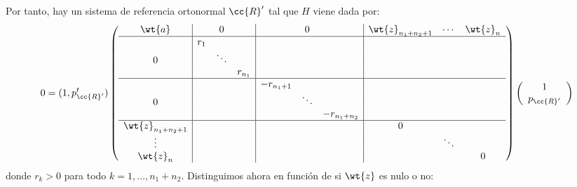Por tanto, hay un sistema de referencia ortonormal $\cc{R}'$ tal que $H$ viene dada por:
\begin{equation*}
    0 = (1, p_{\cc{R}'}^t)\left(
    \begin{array}{c|ccc|ccc|ccc}
        \wt{a} &&0&&&0&&\wt{z}_{n_1+n_2+1}&\cdots&\wt{z}_{n}   \\ \hline
        &r_1&&&&&&&& \\
        0&& \ddots&&&&&&&\\
        &&& r_{n_1}&&&&&&\\ \hline
        &&&& -r_{n_1+1}&&&&&\\
        0&&&&& \ddots&&&&\\
        &&&&&& -r_{n_1+n_2}&&&\\ \hline
        \wt{z}_{n_1+n_2+1}&&&&&&& 0&&\\
        \vdots&&&&&&&& \ddots &\\
        \wt{z}_n&&&&&&&&& 0
    \end{array}
    \right)\left(\begin{array}{c}
        1 \\ p_{\cc{R}'}
    \end{array}\right)
\end{equation*}
donde $r_k>0$ para todo $k=1,\dots,n_1+n_2$. Distinguimos ahora en función de si $\wt{z}$ es nulo o no:
